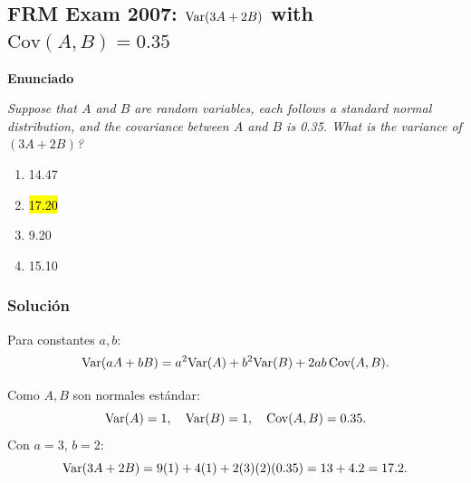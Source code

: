 ﻿\subsection{FRM Exam 2007: \(\mathrm{Var}(3A+2B)\) with \(\mathrm{Cov}(A,B)=0.35\)}

\textbf{Enunciado}

\emph{Suppose that \(A\) and \(B\) are random variables, each follows a standard normal distribution, and the covariance between \(A\) and \(B\) is 0.35. What is the variance of \((3A+2B)\)?}
\begin{enumerate}[label=\alph*.]
\item 14.47
\item \hl{17.20}
\item 9.20
\item 15.10
\end{enumerate}

\subsubsection*{Solución}

Para constantes \(a,b\):
\[
\mathrm{Var}(aA+bB)=a^2\mathrm{Var}(A)+b^2\mathrm{Var}(B)+2ab\,\mathrm{Cov}(A,B).
\]


Como \(A,B\) son normales estándar:
\[
\mathrm{Var}(A)=1,\quad \mathrm{Var}(B)=1,\quad \mathrm{Cov}(A,B)=0.35.
\]
Con \(a=3\), \(b=2\):
\[
\mathrm{Var}(3A+2B)=9(1)+4(1)+2(3)(2)(0.35)=13+4.2=17.2.
\]











